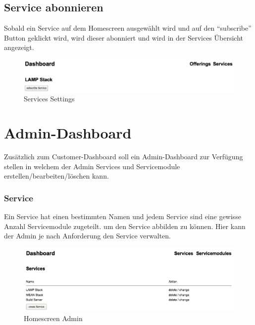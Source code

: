 \subsection{Service abonnieren}
Sobald ein Service auf dem Homescreen ausgewählt wird und auf den ``subscribe'' 
Button geklickt wird, wird dieser abonniert und wird in der Services Übersicht 
angezeigt.
\newline

\begin{figure}[!htbp]
\includegraphics[width=\textwidth]{./04_Anforderungen/images/service_settings}
\caption{Services Settings}
\end{figure}

\newpage
\section{Admin-Dashboard}
Zusätzlich zum Customer-Dashboard soll ein Admin-Dashboard zur Verfügung stellen 
in welchem der Admin Services und Servicemodule erstellen/bearbeiten/löschen kann.

\subsubsection{Service}
Ein Service hat einen bestimmten Namen und jedem Service sind eine gewisse 
Anzahl Servicemodule zugeteilt. um den Service abbilden zu können.
Hier kann der Admin je nach Anforderung den Service verwalten.
\newline
\begin{figure}[!htbp]
\includegraphics[width=\textwidth]{./04_Anforderungen/images/homescreen_admin}
\caption{Homescreen Admin}
\end{figure}

